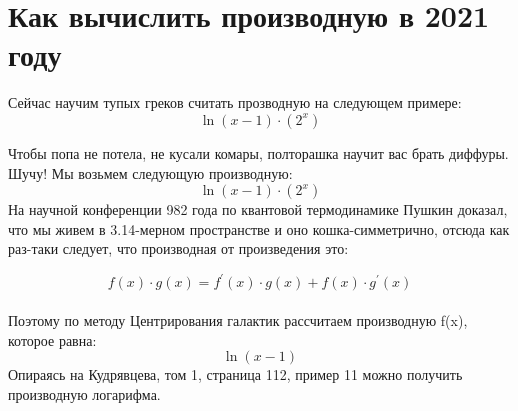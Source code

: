 \documentclass[a4paper,12pt]{article}
\begin{document}
\section{Как вычислить производную в 2021 году}

Сейчас научим тупых греков считать прозводную на следующем примере:
\begin{equation}
\ln(x-1) \cdot \left(2^{x} \right)
\end{equation} 

Чтобы попа не потела, не кусали комары, полторашка научит вас брать диффуры. Шучу! Мы возьмем следующую производную:
\begin{equation}
\ln(x-1) \cdot \left(2^{x} \right)
\end{equation} 
На научной конференции 982 года по квантовой термодинамике Пушкин доказал, что мы живем в 3.14-мерном пространстве и оно кошка-симметрично, отсюда как раз-таки следует, что производная от произведения это:

  \begin{equation}
  f(x) \cdot g(x) = f^{'}(x) \cdot g(x) + f(x) \cdot g^{'}(x)
 \end{equation} \\Поэтому по методу Центрирования галактик рассчитаем производную f(x), которое равна: 
\begin{equation}
\ln(x-1) 
\end{equation} 
Опираясь на Кудрявцева, том 1, страница 112, пример 11 можно получить производную логарифма.
\end{document}
